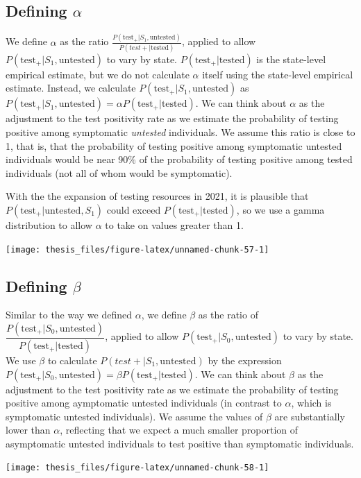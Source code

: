 \documentclass[12pt,twoside]{smiththesis}
\begin{document}
\hypertarget{defining-alpha}{%
\subsection{\texorpdfstring{Defining \(\alpha\)}{Defining \textbackslash alpha}}\label{defining-alpha}}

We define \(\alpha\) as the ratio \(\frac{P(\text{test}_+|S_1, \text{untested})}{P(test+|\text{tested})}\), applied to allow
\(P(\text{test}_+|S_1, \text{untested})\) to vary by state. \(P(\text{test}_+|\text{tested})\) is the state-level empirical estimate, but we do not calculate \(\alpha\) itself using the state-level empirical estimate. Instead, we calculate \(P(\text{test}_+|S_1, \text{untested})\) as \(P(\text{test}_+|S_1, \text{untested}) =\alpha P(\text{test}_+|\text{tested})\). We can think about \(\alpha\) as the adjustment to the test positivity rate as we estimate the probability of testing positive among symptomatic \emph{untested} individuals. We assume this ratio is close to 1, that is, that the probability of testing positive among symptomatic untested individuals would be near 90\% of the probability of testing positive among tested individuals (not all of whom would be symptomatic).

With the the expansion of testing resources in 2021, it is plausible that \(P(\text{test}_+|\text{untested},S_1)\) could exceed \(P(\text{test}_+|\text{tested})\), so we use a gamma distribution to allow \(\alpha\) to take on values greater than 1.
\begin{center}\texttt{[image: thesis\_files/figure-latex/unnamed-chunk-57-1]} \end{center}

\hypertarget{defining-beta}{%
\subsection{\texorpdfstring{Defining \(\beta\)}{Defining \textbackslash beta}}\label{defining-beta}}

Similar to the way we defined \(\alpha\), we define \(\beta\) as the ratio of \(\dfrac{P(\text{test}_+ |S_0, \text{untested})}{P(\text{test}_+|\text{tested})}\), applied to allow \(P(\text{test}_+ |S_0, \text{untested})\) to vary by state. We use \(\beta\) to calculate \(P(test+|S_1, \text{untested})\) by the expression \(P(\text{test}_+|S_0, \text{untested}) =\beta P(\text{test}_+|\text{tested})\). We can think about \(\beta\) as the adjustment to the test positivity rate as we estimate the probability of testing positive among aymptomatic untested individuals (in contrast to \(\alpha\), which is symptomatic untested individuals). We assume the values of \(\beta\) are substantially lower than \(\alpha\), reflecting that we expect a much smaller proportion of asymptomatic untested individuals to test positive than symptomatic individuals.
\begin{center}\texttt{[image: thesis\_files/figure-latex/unnamed-chunk-58-1]} \end{center}
\end{document}
